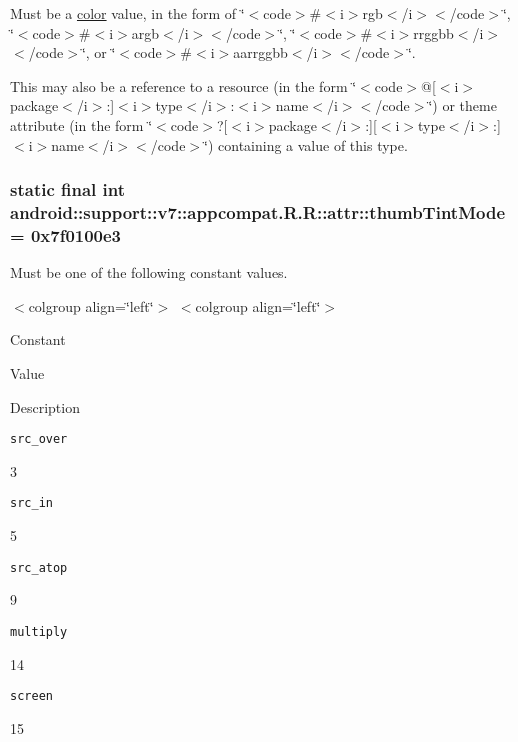 Must be a \hyperlink{classandroid_1_1support_1_1v7_1_1appcompat_1_1_r_1_1color}{color} value, in the form of \char`\"{}$<$code$>$\#$<$i$>$rgb$<$/i$>$$<$/code$>$\char`\"{}, \char`\"{}$<$code$>$\#$<$i$>$argb$<$/i$>$$<$/code$>$\char`\"{}, \char`\"{}$<$code$>$\#$<$i$>$rrggbb$<$/i$>$$<$/code$>$\char`\"{}, or \char`\"{}$<$code$>$\#$<$i$>$aarrggbb$<$/i$>$$<$/code$>$\char`\"{}. 

This may also be a reference to a resource (in the form \char`\"{}$<$code$>$@\mbox{[}$<$i$>$package$<$/i$>$:\mbox{]}$<$i$>$type$<$/i$>$:$<$i$>$name$<$/i$>$$<$/code$>$\char`\"{}) or theme attribute (in the form \char`\"{}$<$code$>$?\mbox{[}$<$i$>$package$<$/i$>$:\mbox{]}\mbox{[}$<$i$>$type$<$/i$>$:\mbox{]}$<$i$>$name$<$/i$>$$<$/code$>$\char`\"{}) containing a value of this type. \hypertarget{classandroid_1_1support_1_1v7_1_1appcompat_1_1_r_1_1attr_bc3b32dc3bd9827f3e616a3a03d000a2}{
\subsubsection[{thumbTintMode}]{\setlength{\rightskip}{0pt plus 5cm}static final int android::support::v7::appcompat.R.R::attr::thumbTintMode = 0x7f0100e3}}
\label{classandroid_1_1support_1_1v7_1_1appcompat_1_1_r_1_1attr_bc3b32dc3bd9827f3e616a3a03d000a2}


Must be one of the following constant values. \begin{TabularC}{0}
\hline
\end{TabularC}
$<$colgroup align=\char`\"{}left\char`\"{}$>$ $<$colgroup align=\char`\"{}left\char`\"{}$>$ 

Constant

Value

Description 

{\tt src\_\-over}

3

{\tt src\_\-in}

5

{\tt src\_\-atop}

9

{\tt multiply}

14

{\tt screen}

15

